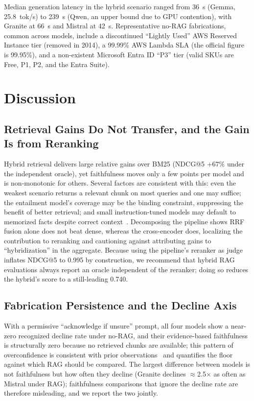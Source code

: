 \documentclass[conference]{IEEEtran}
\begin{document}
Median generation latency in the hybrid scenario ranged from 36~s (Gemma, 25.8~tok/s) to 239~s (Qwen, an upper bound due to GPU contention), with Granite at 66~s and Mistral at 42~s. Representative no-RAG fabrications, common across models, include a discontinued ``Lightly Used'' AWS Reserved Instance tier (removed in 2014), a 99.99\% AWS Lambda SLA (the official figure is 99.95\%), and a non-existent Microsoft Entra ID ``P3'' tier (valid SKUs are Free, P1, P2, and the Entra Suite).
\section{Discussion}
\subsection{Retrieval Gains Do Not Transfer, and the Gain Is from Reranking}
Hybrid retrieval delivers large relative gains over BM25 (NDCG@5 $+67\%$ under the independent oracle), yet faithfulness moves only a few points per model and is non-monotonic for others. Several factors are consistent with this: even the weakest scenario returns a relevant chunk on most queries and one may suffice; the entailment model's coverage may be the binding constraint, suppressing the benefit of better retrieval; and small instruction-tuned models may default to memorized facts despite correct context~\cite{shi2023large}. Decomposing the pipeline shows RRF fusion alone does not beat dense, whereas the cross-encoder does, localizing the contribution to reranking and cautioning against attributing gains to ``hybridization'' in the aggregate. Because using the pipeline's reranker as judge inflates NDCG@5 to 0.995 by construction, we recommend that hybrid RAG evaluations always report an oracle independent of the reranker; doing so reduces the hybrid's score to a still-leading 0.740.
\subsection{Fabrication Persistence and the Decline Axis}
With a permissive ``acknowledge if unsure'' prompt, all four models show a near-zero recognized decline rate under no-RAG, and their evidence-based faithfulness is structurally zero because no retrieved chunks are available; this pattern of overconfidence is consistent with prior observations~\cite{yin2023large} and quantifies the floor against which RAG should be compared. The largest difference between models is not faithfulness but how often they decline (Granite declines $\approx$2.5$\times$ as often as Mistral under RAG); faithfulness comparisons that ignore the decline rate are therefore misleading, and we report the two jointly.
\end{document}
